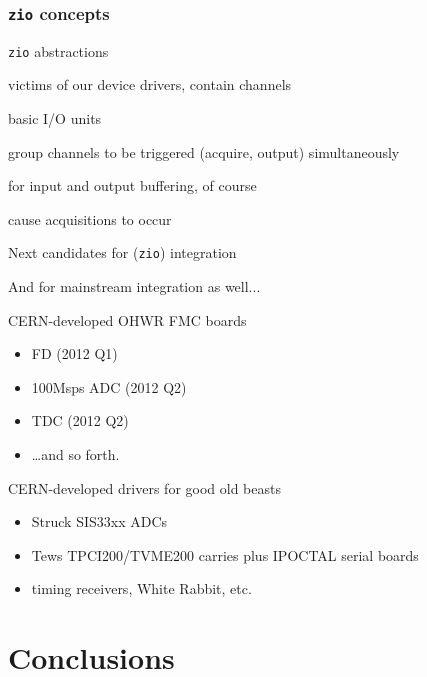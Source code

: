 \documentclass[compress,red]{beamer}
\begin{document}
\begin{frame}
\frametitle{\texttt{zio} concepts}

\begin{block}{\texttt{zio} abstractions}
\begin{description}
\pause\item[devices] victims of our device drivers, contain channels
\pause\item[channels] basic I/O units
\pause\item[channel sets] group channels to be triggered (acquire, output)
	simultaneously
\pause\item[buffers] for input and output buffering, of course
\pause\item[triggers] cause acquisitions to occur
\end{description}
\end{block}

\end{frame}

\begin{frame}{Next candidates for (\texttt{zio}) integration}

And for mainstream integration as well...

\pause
\begin{block}{CERN-developed OHWR FMC boards}
\begin{itemize}
    \pause\item FD (2012 Q1)
    \pause\item 100Msps ADC (2012 Q2)
    \pause\item TDC (2012 Q2)
    \pause\item \ldots and so forth.
\end{itemize}
\end{block}

\pause
\begin{block}{CERN-developed drivers for good old beasts}
\begin{itemize}
\pause \item Struck SIS33xx ADCs
\pause \item Tews TPCI200/TVME200 carries plus IPOCTAL serial boards
\pause \item timing receivers, White Rabbit, etc.
\end{itemize}
\end{block}
\end{frame}

\section{Conclusions}
\end{document}
